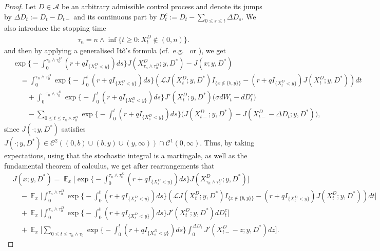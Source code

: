 \documentclass[11pt]{article} %
\DeclareMathOperator{\E}{\mathbb E}
\numberwithin{komcounter}{section}
\numberwithin{equation}{section}
\numberwithin{theorem}{section}
\begin{document}
\begin{proof}
Let $D \in\mathcal{A}$ be an arbitrary admissible control process and denote its jumps by $\Delta D_t:=D_{t}-D_{t-}$ and its continuous part by $D^c_t:=D_t-\sum_{0\leq s\leq t}\Delta D_s$. 
We also introduce the stopping time
\begin{align*}
\tau_n=n\wedge\inf\{t\geq 0:X^D_t\not\in (0,n)\}.
\end{align*}
and then by applying a generalised It\^{o}'s formula (cf.~e.g.~\cite[p.74]{Peskir} or \cite[Theorem 3.2.]{peskir2007change}), we get 
\begin{align*}
&\exp\Big\{-\int_0^{\tau_n\wedge\tau_0^D} (r + qI_{\{X^D_s<y\}})ds \Big\} J(X^D_{\tau_n\wedge\tau_0^D};y,D^*)-J(x;y,D^*)\\
&\quad= \int_0^{\tau_n\wedge\tau_0^D}\exp\Big\{-\int_0^{t} (r + qI_{\{X^D_s<y\}})ds \Big\}\left(\mathcal{L}J(X^D_t;y,D^*) I_{\{x\not\in\{b,y\}\}} - (r+qI_{\{X^D_t<y\}}) J(X^D_t;y,D^*) \right) dt \\
&\quad\quad + \int_0^{-\tau_n\wedge\tau_0^D} \exp\Big\{-\int_0^{t} (r + qI_{\{X^D_s<y\}})ds \Big\} J'(X^D_t;y,D^*) \big( \sigma dW_t - dD^c_t \big)\\
&\quad\quad - \sum_{0\leq t\leq \tau_n\wedge\tau_0^D} \exp\Big\{-\int_0^{t} (r + qI_{\{X^D_s<y\}}) ds \Big\} \big( J(X_{t-}^D;y,D^*) - J(X_{t-}^D-\Delta D_t;y,D^*) \big),
\end{align*}
since $J(\cdot;y,D^*)$ satisfies $J(\cdot;y,D^*) \in \mathcal{C}^2((0,b) \cup (b,y) \cup (y,\infty)) \cap \mathcal{C}^1(0,\infty)$.  
Thus, by taking expectations, using that the stochastic integral is a martingale, as well as the fundamental theorem of calculus, we get after rearrangements that
\begin{align*}
&J(x;y,D^*) 
= \E_x\bigg[\exp\Big\{-\int_0^{\tau_n\wedge\tau_0^D} (r + qI_{\{X^D_s<y\}})ds \Big\} J(X^D_{\tau_n\wedge\tau_0^D};y,D^*)\bigg] \\ 
&\quad - \E_x\bigg[\int_0^{\tau_n\wedge\tau_0^D}\exp\Big\{-\int_0^{t} (r + qI_{\{X^D_s<y\}})ds \Big\} \left(\mathcal{L}J(X^D_t;y,D^*) I_{\{x\not\in\{b,y\}\}} - (r+qI_{\{X^D_t<y\}}) J(X^D_t;y,D^*) \right) dt \bigg] \\ 
&\quad + \E_x\bigg[\int_0^{\tau_n\wedge\tau_0^D} \exp\Big\{-\int_0^{t} (r + qI_{\{X^D_s<y\}})ds \Big\} J'(X^D_t;y,D^*) dD^c_t \bigg] \\ 
&\quad + \E_x\bigg[\sum_{0\leq t\leq \tau_n\wedge\tau_0} \exp\Big\{-\int_0^{t} (r + qI_{\{X^D_s<y\}}) ds \Big\} \int_0^{\Delta D_t} J'(X^D_{t-}-z;y,D^*) dz \bigg].
\end{align*}

\end{proof}
\end{document}
